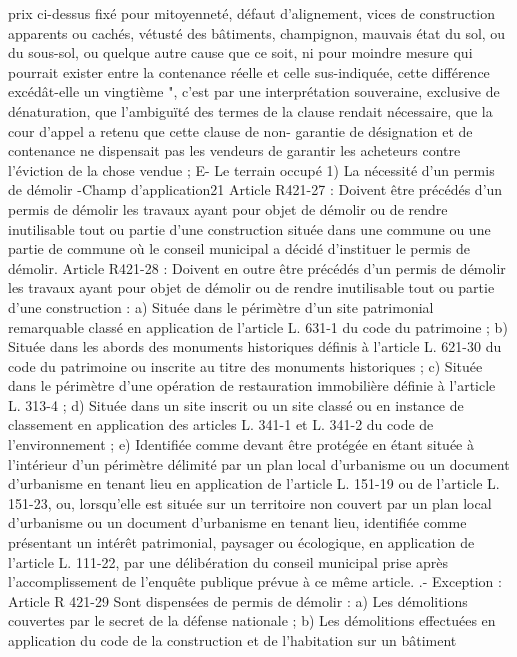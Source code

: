 \documentclass[11pt,a4paper]{report}
\begin{document}
	prix ci-dessus fixé pour mitoyenneté, défaut d'alignement, vices de construction apparents ou cachés, vétusté
	des bâtiments, champignon, mauvais état du sol, ou du sous-sol, ou quelque autre cause que ce soit, ni pour
	moindre mesure qui pourrait exister entre la contenance réelle et celle sus-indiquée, cette différence
	excédât-elle un vingtième ", c'est par une interprétation souveraine, exclusive de dénaturation, que
	l'ambiguïté des termes de la clause rendait nécessaire, que la cour d'appel a retenu que cette clause de non-
	garantie de désignation et de contenance ne dispensait pas les vendeurs de garantir les acheteurs contre
	l'éviction de la chose vendue ;
	E- Le terrain occupé
	1) La nécessité d’un permis de démolir
	-Champ d’application21
	Article R421-27 : Doivent être précédés d'un permis de démolir les travaux ayant pour objet de démolir ou de
	rendre inutilisable tout ou partie d'une construction située dans une commune ou une partie de commune où le
	conseil municipal a décidé d'instituer le permis de démolir.
	Article R421-28 : Doivent en outre être précédés d'un permis de démolir les travaux ayant pour objet de
	démolir ou de rendre inutilisable tout ou partie d'une construction :
	a) Située dans le périmètre d'un site patrimonial remarquable classé en application de l'article L. 631-1 du code
	du patrimoine ;
	b) Située dans les abords des monuments historiques définis à l'article L. 621-30 du code du patrimoine ou
	inscrite au titre des monuments historiques ;
	c) Située dans le périmètre d'une opération de restauration immobilière définie à l'article L. 313-4 ;
	d) Située dans un site inscrit ou un site classé ou en instance de classement en application des articles L. 341-1
	et L. 341-2 du code de l'environnement ;
	e) Identifiée comme devant être protégée en étant située à l'intérieur d'un périmètre délimité par un plan local
	d'urbanisme ou un document d'urbanisme en tenant lieu en application de l'article L. 151-19 ou de l'article L.
	151-23, ou, lorsqu'elle est située sur un territoire non couvert par un plan local d'urbanisme ou un document
	d'urbanisme en tenant lieu, identifiée comme présentant un intérêt patrimonial, paysager ou écologique, en
	application de l'article L. 111-22, par une délibération du conseil municipal prise après l'accomplissement de
	l'enquête publique prévue à ce même article.
	.- Exception : Article R 421-29 Sont dispensées de permis de démolir :
	a) Les démolitions couvertes par le secret de la défense nationale ;
	b) Les démolitions effectuées en application du code de la construction et de l'habitation sur un bâtiment
\end{document}
